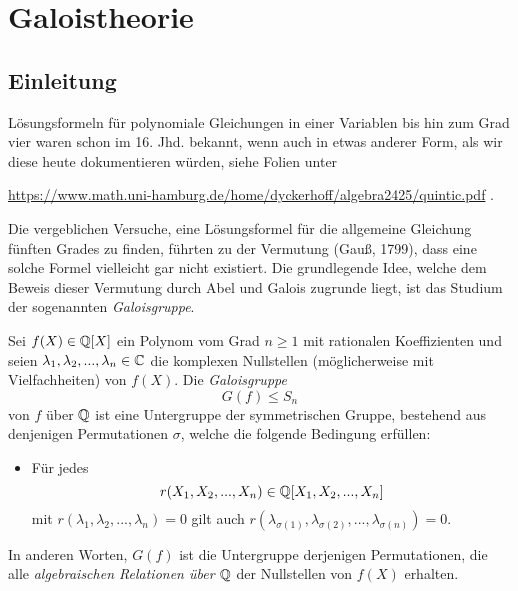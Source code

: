 \documentclass{book}
\begin{document}
\chapter{Galoistheorie}

\section{Einleitung}%

Lösungsformeln für polynomiale Gleichungen in einer Variablen bis hin zum Grad
vier waren schon im 16. Jhd. bekannt, wenn auch in etwas anderer Form, als wir
diese heute dokumentieren würden, siehe Folien unter
\begin{center}
\url{https://www.math.uni-hamburg.de/home/dyckerhoff/algebra2425/quintic.pdf} .
\end{center}

Die vergeblichen Versuche, eine Lösungsformel für die allgemeine Gleichung
fünften Grades zu finden, führten zu der Vermutung (Gauß, 1799), dass eine
solche Formel vielleicht gar nicht existiert. Die grundlegende Idee, welche dem
Beweis dieser Vermutung durch Abel und Galois zugrunde liegt, ist das Studium
der sogenannten \emph{Galoisgruppe}.

\begin{defi}
    \label{defi:galoisgruppe}
    Sei $f(X) \in \mathbb{Q}[X]$ ein Polynom vom Grad $n \ge 1$ mit rationalen Koeffizienten und seien
    $\lambda_1, \lambda_2, ..., \lambda_n \in \mathbb{C}$ die komplexen Nullstellen (möglicherweise mit Vielfachheiten) von
    $f(X)$. Die \emph{Galoisgruppe}
    \[
        G(f) \le S_n
    \]
    von $f$ über $\mathbb{Q}$ ist eine Untergruppe der symmetrischen Gruppe, bestehend aus denjenigen
    Permutationen $\sigma$, welche die folgende Bedingung erfüllen:
    \begin{itemize}
        \item Für jedes
            \[
                r(X_1, X_2, ..., X_n) \in \mathbb{Q}[X_1,X_2, ..., X_n]
            \]
            mit $r(\lambda_1, \lambda_2, ..., \lambda_n) = 0$ gilt auch
            $r(\lambda_{\sigma(1)}, \lambda_{\sigma(2)}, ..., \lambda_{\sigma(n)})
            = 0$. 
    \end{itemize}
    In anderen Worten, $G(f)$ ist die Untergruppe derjenigen Permutationen, die
    alle \emph{algebraischen Relationen über $\mathbb{Q}$} der Nullstellen von $f(X)$
    erhalten.
\end{defi}
\end{document}
